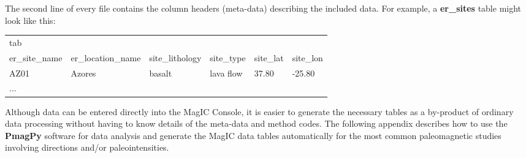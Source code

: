 \documentclass[11pt]{book}
\begin{document}
{{{The second line of every file contains the column headers (meta-data) describing the included data.   For example, a {\bf er\_sites} table might look like this:

{\hoffset -1in
\begin{tabular}{llllll}
\hline
tab\hskip 2em{\bf er\_sites}\\
er\_site\_name&er\_location\_name&site\_lithology&site\_type&site\_lat&site\_lon\\AZ01&Azores&basalt&lava flow&37.80&-25.80\\
...\\
\hline
\end{tabular}
}

Although data can be entered directly into the MagIC Console, it is easier to generate the necessary tables as a by-product of ordinary data processing without having to know details of the meta-data and method codes. 
  The following appendix describes how to use the {\bf PmagPy} software for  data analysis and generate the MagIC data tables automatically for the most common paleomagnetic studies involving directions and/or paleointensities.    
  
}}}
\end{document}
